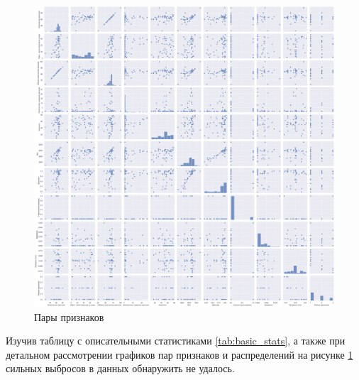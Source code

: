 \begin{figure}[H]
\begin{center}
\includegraphics[width=1.0\linewidth]{src/img/pair_plot.png}
\caption{Пары признаков}
\label{fig:pair_plot}
\end{center}
\end{figure}

Изучив таблицу с описательными статистиками \ref{tab:basic_stats}, а также при детальном рассмотрении графиков пар признаков и распределений на рисунке \ref{fig:pair_plot} сильных выбросов в данных обнаружить не удалось.

